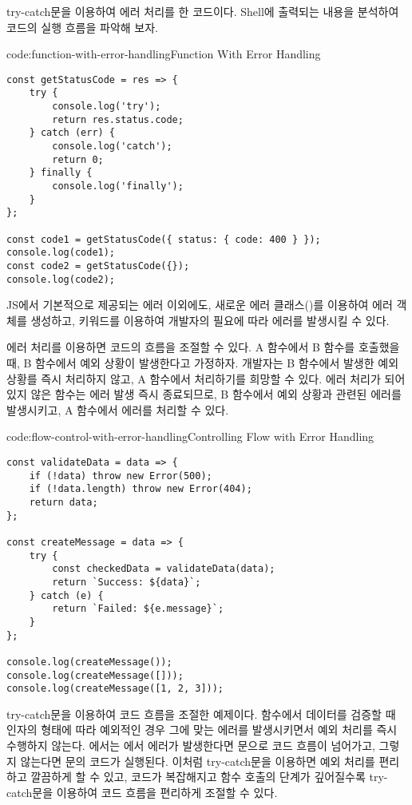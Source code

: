 \은 try-catch문을 이용하여 에러 처리를 한 코드이다. Shell에 출력되는 내용을 분석하여 코드의 실행 흐름을 파악해 보자.

\begin{codeenv}{code:function-with-error-handling}{Function With Error Handling}\begin{verbatim}
const getStatusCode = res => {
    try {
        console.log('try');
        return res.status.code;
    } catch (err) {
        console.log('catch');
        return 0;
    } finally {
        console.log('finally');
    }
};

const code1 = getStatusCode({ status: { code: 400 } });
console.log(code1);
const code2 = getStatusCode({});
console.log(code2);
\end{verbatim}
\end{codeenv}

JS에서 기본적으로 제공되는 에러 이외에도, 새로운 에러 클래스()를 이용하여 에러 객체를 생성하고,  키워드를 이용하여 개발자의 필요에 따라 에러를 발생시킬 수 있다.

에러 처리를 이용하면 코드의 흐름을 조절할 수 있다. A 함수에서 B 함수를 호출했을 때, B 함수에서 예외 상황이 발생한다고 가정하자. 개발자는 B 함수에서 발생한 예외 상황를 즉시 처리하지 않고, A 함수에서 처리하기를 희망할 수 있다. 에러 처리가 되어있지 않은 함수는 에러 발생 즉시 종료되므로, B 함수에서 예외 상황과 관련된 에러를 발생시키고, A 함수에서 에러를 처리할 수 있다.

\begin{codeenv}{code:flow-control-with-error-handling}{Controlling Flow with Error Handling}\begin{verbatim}
const validateData = data => {
    if (!data) throw new Error(500);
    if (!data.length) throw new Error(404);
    return data;
};

const createMessage = data => {
    try {
        const checkedData = validateData(data);
        return `Success: ${data}`;
    } catch (e) {
        return `Failed: ${e.message}`;
    }
};

console.log(createMessage());
console.log(createMessage([]));
console.log(createMessage([1, 2, 3]));
\end{verbatim}
\end{codeenv}

\은 try-catch문을 이용하여 코드 흐름을 조절한 예제이다.  함수에서 데이터를 검증할 때 인자의 형태에 따라 예외적인 경우 그에 맞는 에러를 발생시키면서 예외 처리를 즉시 수행하지 않는다. 에서는 에서 에러가 발생한다면  문으로 코드 흐름이 넘어가고, 그렇지 않는다면  문의 코드가 실행된다. 이처럼 try-catch문을 이용하면 예외 처리를 편리하고 깔끔하게 할 수 있고, 코드가 복잡해지고 함수 호출의 단계가 깊어질수록 try-catch문을 이용하여 코드 흐름을 편리하게 조절할 수 있다.

